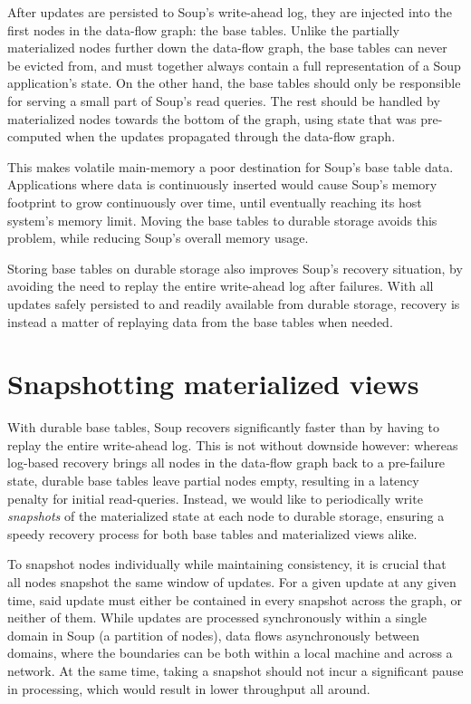 After updates are persisted to Soup's write-ahead log, they are injected into
the first nodes in the data-flow graph: the base tables. Unlike the partially
materialized nodes further down the data-flow graph, the base tables can never
be evicted from, and must together always contain a full representation of a
Soup application's state. On the other hand, the base tables should only be
responsible for serving a small part of Soup's read queries. The rest should be
handled by materialized nodes towards the bottom of the graph, using state that
was pre-computed when the updates propagated through the data-flow graph.

This makes volatile main-memory a poor destination for Soup's base table data.
Applications where data is continuously inserted would cause Soup's memory
footprint to grow continuously over time, until eventually reaching its host
system's memory limit. Moving the base tables to durable storage avoids this
problem, while reducing Soup's overall memory usage.

Storing base tables on durable storage also improves Soup's recovery situation,
by avoiding the need to replay the entire write-ahead log after failures. With
all updates safely persisted to and readily available from durable storage,
recovery is instead a matter of replaying data from the base tables when needed.

\section{Snapshotting materialized views}

With durable base tables, Soup recovers significantly faster than by having to
replay the entire write-ahead log. This is not without downside however: whereas
log-based recovery brings all nodes in the data-flow graph back to a
pre-failure state, durable base tables leave partial nodes empty, resulting in a
latency penalty for initial read-queries. Instead, we would like to periodically
write \textit{snapshots} of the materialized state at each node to durable
storage, ensuring a speedy recovery process for both base tables and
materialized views alike.

To snapshot nodes individually while maintaining consistency, it is crucial that
all nodes snapshot the same window of updates. For a given update at any given
time, said update must either be contained in every snapshot across the graph,
or neither of them. While updates are processed synchronously within a single
domain in Soup (a partition of nodes), data flows asynchronously between
domains, where the boundaries can be both within a local machine and across a
network. At the same time, taking a snapshot should not incur a significant
pause in processing, which would result in lower throughput all around.

